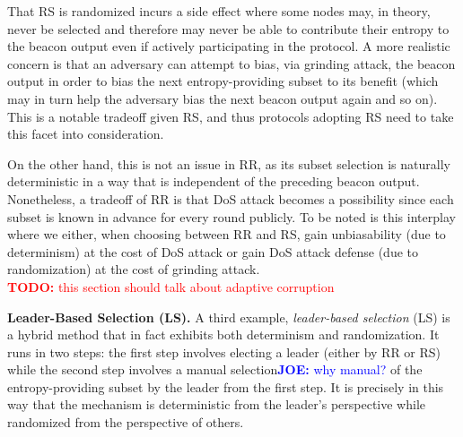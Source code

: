 \documentclass[letterpaper,twocolumn,10pt]{article}
\theoremstyle{definition}
\theoremstyle{remark}
\newcommand{\todo}[1]{\textcolor{red}{\textbf{TODO:} #1}}
\newcommand{\joenote}[1]{\textcolor{blue}{\textbf{JOE:} #1}}
\begin{document}
That RS is randomized incurs a side effect where some nodes may, in theory, never be selected and therefore may never be able to contribute their entropy to the beacon output even if actively participating in the protocol. A more realistic concern is that an adversary can attempt to bias, via grinding attack, the beacon output in order to bias the next entropy-providing subset to its benefit (which may in turn help the adversary bias the next beacon output again and so on). This is a notable tradeoff given RS, and thus protocols adopting RS need to take this facet into consideration.

On the other hand, this is not an issue in RR, as its subset selection is naturally deterministic in a way that is independent of the preceding beacon output. Nonetheless, a tradeoff of RR is that DoS attack becomes a possibility since each subset is known in advance for every round publicly. To be noted is this interplay where we either, when choosing between RR and RS, gain unbiasability (due to determinism) at the cost of DoS attack or gain DoS attack defense (due to randomization) at the cost of grinding attack.\\\todo{this section should talk about adaptive corruption}

\noindent\textbf{Leader-Based Selection (LS).} A third example, \textit{leader-based selection} (LS) is a hybrid method that in fact exhibits both determinism and randomization. It runs in two steps: the first step involves electing a leader (either by RR or RS) while the second step involves a manual selection\joenote{why manual?} of the entropy-providing subset by the leader from the first step. It is precisely in this way that the mechanism is deterministic from the leader's perspective while randomized from the perspective of others.
\end{document}
